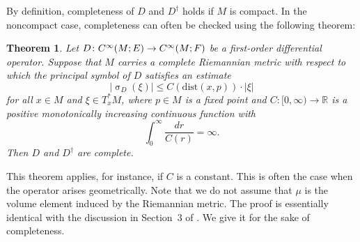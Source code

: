 \documentclass[a4paper,10pt,reqno]{amsart}
\newcommand{\sym}{\upsigma}
\newcommand{\R}{\mathbb{R}}
\newcommand{\Ck}[2][{}]{{\rm C}^{#2}_{\rm #1}}%
\newtheorem{theorem}{Theorem}[section]
\theoremstyle{definition}
\begin{document}
By definition, completeness of $D$ and $D^\dagger$ holds if $M$ is compact.
In the noncompact case, completeness can often be checked using the following theorem:

\begin{theorem}\label{Thm:cherwolf}
Let $D\colon \Ck{\infty}(M;E)\to\Ck{\infty}(M;F)$ be a first-order differential operator.
Suppose that $M$ carries a complete Riemannian metric with respect to which the principal symbol of $D$ satisfies an estimate
\begin{equation}
|\sym_D(\xi)| \le C(\mathrm{dist}(x,p))\cdot|\xi|
\label{eq:symest}
\end{equation}
for all $x\in M$ and $\xi\in T_x^*M$, where $p\in M$ is a fixed point and $C:[0,\infty)\to\R$ is a positive monotonically increasing continuous function with
\begin{equation}
\int_0^\infty \frac{dr}{C(r)} = \infty .
\label{eq:chernoff}
\end{equation}
Then $D$ and $D^\dagger$ are complete.
\end{theorem}

This theorem applies, for instance, if $C$ is a constant.
This is often the case when  the operator arises geometrically.
Note that we do not assume that $\mu$ is the volume element induced by the Riemannian metric.
The proof is essentially identical with the discussion in Section~3 of \cite{BB12}.
We give it for the sake of completeness.
\end{document}
